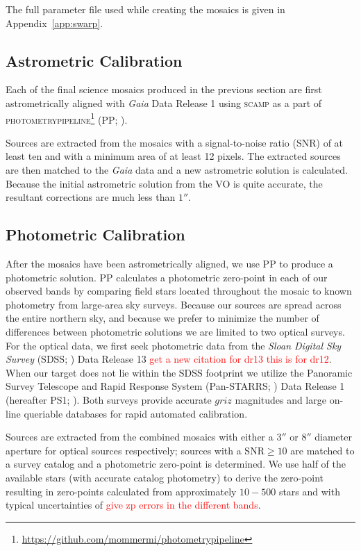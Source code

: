 \documentclass[apj, revtex4]{emulateapj}
\newcommand{\editorial}[1]{\textcolor{red}{#1}}
\begin{document}
The full parameter file used while creating the mosaics is given in Appendix~\ref{app:swarp}.

\subsection{Astrometric Calibration}
Each of the final science mosaics produced in the previous section are first astrometrically aligned with \textit{Gaia} \citep{GaiaCollaboration2016} Data Release 1 \citep{GaiaCollaboration2016a} using \textsc{scamp} \citep{Bertin2006} as a part of \textsc{photometrypipeline}\footnote{\url{https://github.com/mommermi/photometrypipeline}} (PP; \citealt{Mommert2017}).

Sources are extracted from the mosaics with a signal-to-noise ratio (SNR) of at least ten and with a minimum area of at least 12 pixels. The extracted sources are then matched to the \textit{Gaia} data and a new astrometric solution is calculated. Because the initial astrometric solution from the VO is quite accurate, the resultant corrections are much less than $1''$.

\subsection{Photometric Calibration}
After the mosaics have been astrometrically aligned, we use PP to produce a photometric solution. PP calculates a photometric zero-point in each of our observed bands by comparing field stars located throughout the mosaic to known photometry from large-area sky surveys. Because our sources are spread across the entire northern sky, and because we prefer to minimize the number of differences between photometric solutions we are limited to two optical surveys. For the optical data, we first seek photometric data from the \textit{Sloan Digital Sky Survey} (SDSS; \citealt{York2000}) Data Release 13 \citep{Alam2015} \editorial{get a new citation for dr13 this is for dr12}. When our target does not lie within the SDSS footprint we utilize the Panoramic Survey Telescope and Rapid Response System (Pan-STARRS; \citealt{Chambers2016}) Data Release 1 (hereafter PS1; \citealt{Flewelling2016}). Both surveys provide accurate $griz$ magnitudes and large on-line queriable databases for rapid automated calibration.

Sources are extracted from the combined mosaics with either a $3''$ or $8''$ diameter aperture for optical sources respectively; sources with a SNR$\ge10$ are matched to a survey catalog and a photometric zero-point is determined. We use half of the available stars (with accurate catalog photometry) to derive the zero-point resulting in zero-points calculated from approximately $10-500$ stars and with typical uncertainties of \editorial{give zp errors in the different bands}.
\end{document}
